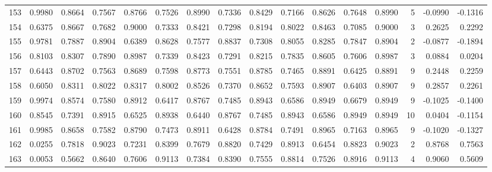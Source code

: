 \begin{tabular}{lrrrrrrrrrrrrrrr}
153 &      0.9980 &  0.8664 &  0.7567 &  0.8766 &  0.7526 &  0.8990 &  0.7336 &  0.8429 &  0.7166 &  0.8626 &   0.7648 &     0.8990 &      5 &                   -0.0990 &                    -0.1316 \\
154 &      0.6375 &  0.8667 &  0.7682 &  0.9000 &  0.7333 &  0.8421 &  0.7298 &  0.8194 &  0.8022 &  0.8463 &   0.7085 &     0.9000 &      3 &                    0.2625 &                     0.2292 \\
155 &      0.9781 &  0.7887 &  0.8904 &  0.6389 &  0.8628 &  0.7577 &  0.8837 &  0.7308 &  0.8055 &  0.8285 &   0.7847 &     0.8904 &      2 &                   -0.0877 &                    -0.1894 \\
156 &      0.8103 &  0.8307 &  0.7890 &  0.8987 &  0.7339 &  0.8423 &  0.7291 &  0.8215 &  0.7835 &  0.8605 &   0.7606 &     0.8987 &      3 &                    0.0884 &                     0.0204 \\
157 &      0.6443 &  0.8702 &  0.7563 &  0.8689 &  0.7598 &  0.8773 &  0.7551 &  0.8785 &  0.7465 &  0.8891 &   0.6425 &     0.8891 &      9 &                    0.2448 &                     0.2259 \\
158 &      0.6050 &  0.8311 &  0.8022 &  0.8317 &  0.8002 &  0.8526 &  0.7370 &  0.8652 &  0.7593 &  0.8907 &   0.6403 &     0.8907 &      9 &                    0.2857 &                     0.2261 \\
159 &      0.9974 &  0.8574 &  0.7580 &  0.8912 &  0.6417 &  0.8767 &  0.7485 &  0.8943 &  0.6586 &  0.8949 &   0.6679 &     0.8949 &      9 &                   -0.1025 &                    -0.1400 \\
160 &      0.8545 &  0.7391 &  0.8915 &  0.6525 &  0.8938 &  0.6440 &  0.8767 &  0.7485 &  0.8943 &  0.6586 &   0.8949 &     0.8949 &     10 &                    0.0404 &                    -0.1154 \\
161 &      0.9985 &  0.8658 &  0.7582 &  0.8790 &  0.7473 &  0.8911 &  0.6428 &  0.8784 &  0.7491 &  0.8965 &   0.7163 &     0.8965 &      9 &                   -0.1020 &                    -0.1327 \\
162 &      0.0255 &  0.7818 &  0.9023 &  0.7231 &  0.8399 &  0.7679 &  0.8820 &  0.7429 &  0.8913 &  0.6454 &   0.8823 &     0.9023 &      2 &                    0.8768 &                     0.7563 \\
163 &      0.0053 &  0.5662 &  0.8640 &  0.7606 &  0.9113 &  0.7384 &  0.8390 &  0.7555 &  0.8814 &  0.7526 &   0.8916 &     0.9113 &      4 &                    0.9060 &                     0.5609 \\

\end{tabular}
